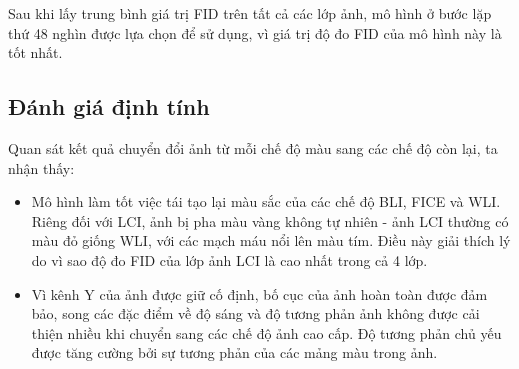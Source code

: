 \documentclass[12pt]{extreport}
\begin{document}
Sau khi lấy trung bình giá trị FID trên tất cả các lớp ảnh, mô hình ở bước lặp thứ 48 nghìn được lựa chọn để sử dụng, vì giá trị độ đo FID của mô hình này là tốt nhất.

\subsection{Đánh giá định tính}

Quan sát kết quả chuyển đổi ảnh từ mỗi chế độ màu sang các chế độ còn lại, ta nhận thấy:
\begin{itemize}
    \item Mô hình làm tốt việc tái tạo lại màu sắc của các chế độ BLI, FICE và WLI. Riêng đối với LCI, ảnh bị pha màu vàng không tự nhiên - ảnh LCI thường có màu đỏ giống WLI, với các mạch máu nổi lên màu tím. Điều này giải thích lý do vì sao độ đo FID của lớp ảnh LCI là cao nhất trong cả 4 lớp.
    \item Vì kênh Y của ảnh được giữ cố định, bố cục của ảnh hoàn toàn được đảm bảo, song các đặc điểm về độ sáng và độ tương phản ảnh không được cải thiện nhiều khi chuyển sang các chế độ ảnh cao cấp. Độ tương phản chủ yếu được tăng cường bởi sự tương phản của các mảng màu trong ảnh.
\end{itemize}
\end{document}
